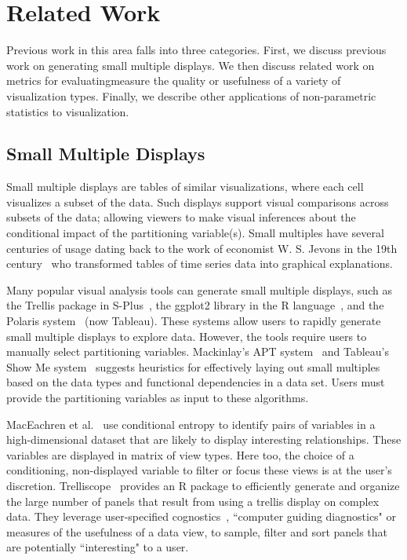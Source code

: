 \section{Related Work}
\label{sec:related}
Previous work in this area falls into three categories. First, we discuss previous work on generating small multiple displays. We then discuss related work on metrics for evaluatingmeasure the quality or usefulness of a variety of visualization types. Finally, we describe other applications of non-parametric statistics to visualization.

\subsection{Small Multiple Displays}
Small multiple displays are tables of similar visualizations, where each cell visualizes a subset of the data. Such displays support visual comparisons across subsets of the data; allowing viewers to make visual inferences about the conditional impact of the partitioning variable(s). Small multiples have several centuries of usage dating back to the work of economist W. S. Jevons in the 19th century~\cite{Kelley1973} who transformed tables of time series data into graphical explanations. 

Many popular visual analysis tools can generate small multiple displays, such as the Trellis package in S-Plus~\cite{Becker1996-manual}, the ggplot2 library in the R language~\cite{Wickham2006}, and the Polaris system~\cite{Stolte2002} (now Tableau). These systems allow users to rapidly generate small multiple displays to explore data. However, the tools require users to manually select partitioning variables. Mackinlay's APT system~\cite{mackinlay1986} and Tableau's Show Me system~\cite{mackinlay2007} suggests heuristics for effectively laying out small multiples based on the data types and functional dependencies in a data set. Users must provide the partitioning variables as input to these algorithms. 

MacEachren et al.~\cite{Maceachren2003} use conditional entropy to identify pairs of variables in a high-dimensional dataset that are likely to display interesting relationships. These variables are displayed in matrix of view types. Here too, the choice of a conditioning, non-displayed variable to filter or focus these views is at the user's discretion. Trelliscope~\cite{Hafen2013} provides an R package to efficiently generate and organize the large number of panels that result from using a trellis display on complex data. They leverage user-specified cognostics~\cite{Tukey1982}, ``computer guiding diagnostics" or measures of the usefulness of a data view, to sample, filter and sort panels that are potentially ``interesting" to a user. 

